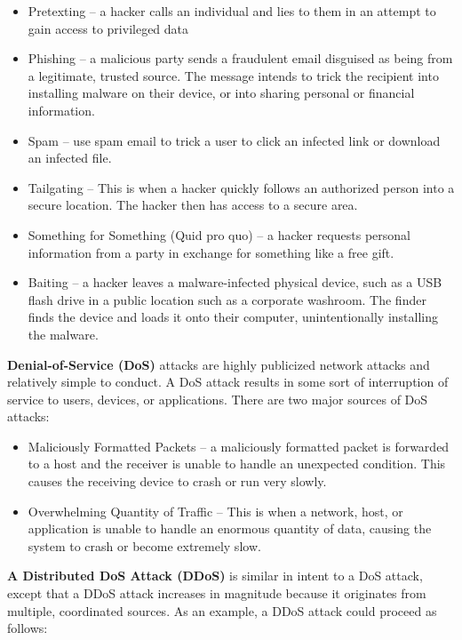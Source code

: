 \begin{itemize}
\item Pretexting -- a hacker calls an individual and lies to them in an attempt to gain access to privileged data
\item Phishing -- a malicious party sends a fraudulent email disguised as being from a legitimate, trusted source. The message intends to trick the recipient into installing malware on their device, or into sharing personal or financial information.
\item Spam -- use spam email to trick a user to click an infected link or download an infected file.
\item Tailgating -- This is when a hacker quickly follows an authorized person into a secure location. The hacker then has access to a secure area.
\item Something for Something (Quid pro quo) -- a hacker requests personal information from a party in exchange for something like a free gift.
\item Baiting -- a hacker leaves a malware-infected physical device, such as a USB flash drive in a public location such as a corporate washroom. The finder finds the device and loads it onto their computer, unintentionally installing the malware.
\end{itemize}

\textbf{Denial-of-Service (DoS)} attacks are highly publicized network attacks and relatively simple to conduct. A DoS attack results in some sort of interruption of service to users, devices, or applications. There are two major sources of DoS attacks:

\begin{itemize}
\item Maliciously Formatted Packets -- a maliciously formatted packet is forwarded to a host and the receiver is unable to handle an unexpected condition. This causes the receiving device to crash or run very slowly.
\item Overwhelming Quantity of Traffic -- This is when a network, host, or application is unable to handle an enormous quantity of data, causing the system to crash or become extremely slow.
\end{itemize}

\textbf{A Distributed DoS Attack (DDoS)} is similar in intent to a DoS attack, except that a DDoS attack increases in magnitude because it originates from multiple, coordinated sources. As an example, a DDoS attack could proceed as follows:

